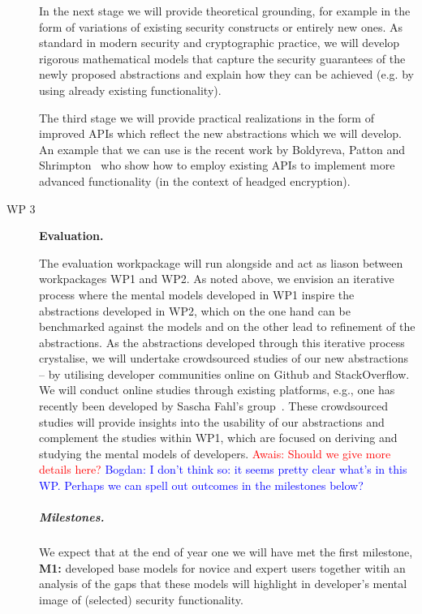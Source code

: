 \documentclass[10pt]{article}
\newcommand{\bw}[1]{{\textcolor{blue} {Bogdan: #1}}}
\newcommand{\ar}[1]{{\textcolor{red} {Awais: #1}}}
\begin{document}
\begin{description}
In the next stage we will provide theoretical grounding, for example in the form of variations of existing security constructs or entirely new ones.  As standard in modern security and cryptographic practice, we will develop rigorous mathematical models that capture the security guarantees of the newly proposed abstractions and explain how they can be achieved (e.g. by using already existing functionality).  


 The third stage we will provide practical realizations in the form of improved APIs which reflect the new abstractions which we will develop.  
An example that we can use is the recent work by Boldyreva, Patton and Shrimpton~\cite{C:BolPatShr17} who show how to employ existing APIs to implement more advanced functionality (in the context of headged encryption).
\vspace{.3cm}
\iffalse
Technically, we will provide wrappers to some of the most commonly used libraries.  
We remark that improved APIs is one of the feature of the NaCl cryptographic library~\cite{bernstein}; currently that library only considers lower level primitives.  
\fi

\item[WP 3] \textbf{Evaluation.}

The evaluation workpackage will run alongside and act as liason between workpackages WP1 and WP2.  
As noted above, we envision an iterative process where the mental models developed in WP1 inspire the abstractions developed in WP2, which on the one hand can be benchmarked against the models and on the other lead to refinement of the abstractions. As the abstractions developed through this iterative process crystalise, we will undertake crowdsourced studies of our new abstractions -- by utilising developer communities online on Github and StackOverflow. We will conduct online studies through existing platforms, e.g., one has recently been developed by Sascha Fahl's group~\cite{stransky2017}. These crowdsourced studies will provide insights into the usability of our abstractions and complement the studies within WP1, which are focused on deriving and studying the mental models of developers. \ar{Should we give more details here?}
\bw{I don't think so: it seems pretty clear what's in this WP. Perhaps we can spell out outcomes in the milestones below? }

\vspace{-\baselineskip}
\subparagraph{Milestones.}

We expect that at the end of year one we will have met the first milestone, \textbf{M1:} developed base models for novice and expert users together witih an analysis of the gaps that these models will highlight in developer's mental image of (selected) security functionality.


\end{description}
\end{document}
